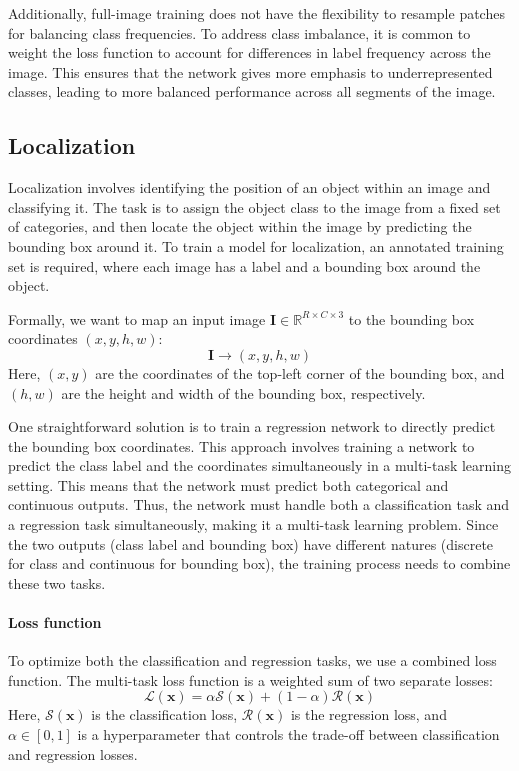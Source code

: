 Additionally, full-image training does not have the flexibility to resample patches for balancing class frequencies. 
To address class imbalance, it is common to weight the loss function to account for differences in label frequency across the image. 
This ensures that the network gives more emphasis to underrepresented classes, leading to more balanced performance across all segments of the image.

\subsection{Localization}
Localization involves identifying the position of an object within an image and classifying it. 
The task is to assign the object class to the image from a fixed set of categories, and then locate the object within the image by predicting the bounding box around it.
To train a model for localization, an annotated training set is required, where each image has a label and a bounding box around the object.

Formally, we want to map an input image $\mathbf{I}\in \mathbb{R}^{R\times C \times 3}$ to the bounding box coordinates $(x,y, h, w)$: 
\[\mathbf{I}\rightarrow(x,y, h, w)\]
Here, $(x, y)$ are the coordinates of the top-left corner of the bounding box, and $(h, w)$ are the height and width of the bounding box, respectively.

One straightforward solution is to train a regression network to directly predict the bounding box coordinates.
This approach involves training a network to predict the class label and the coordinates simultaneously in a multi-task learning setting.
This means that the network must predict both categorical and continuous outputs.
Thus, the network must handle both a classification task and a regression task simultaneously, making it a multi-task learning problem. 
Since the two outputs (class label and bounding box) have different natures (discrete for class and continuous for bounding box), the training process needs to combine these two tasks.

\paragraph*{Loss function}
To optimize both the classification and regression tasks, we use a combined loss function. 
The multi-task loss function is a weighted sum of two separate losses:
\[\mathcal{L}(\mathbf{x})=\alpha\mathcal{S}(\mathbf{x})+(1-\alpha)\mathcal{R}(\mathbf{x})\]
Here, $\mathcal{S}(\mathbf{x})$ is the classification loss, $\mathcal{R}(\mathbf{x})$ is the regression loss, and $\alpha\in[0,1]$ is a hyperparameter that controls the trade-off between classification and regression losses.

